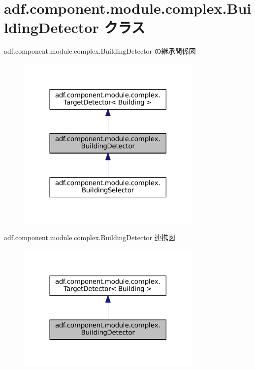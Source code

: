 \hypertarget{classadf_1_1component_1_1module_1_1complex_1_1BuildingDetector}{}\section{adf.\+component.\+module.\+complex.\+Building\+Detector クラス}
\label{classadf_1_1component_1_1module_1_1complex_1_1BuildingDetector}


adf.\+component.\+module.\+complex.\+Building\+Detector の継承関係図
\nopagebreak
\begin{figure}[H]
\begin{center}
\leavevmode
\includegraphics[width=257pt]{classadf_1_1component_1_1module_1_1complex_1_1BuildingDetector__inherit__graph}
\end{center}
\end{figure}


adf.\+component.\+module.\+complex.\+Building\+Detector 連携図
\nopagebreak
\begin{figure}[H]
\begin{center}
\leavevmode
\includegraphics[width=257pt]{classadf_1_1component_1_1module_1_1complex_1_1BuildingDetector__coll__graph}
\end{center}
\end{figure}
